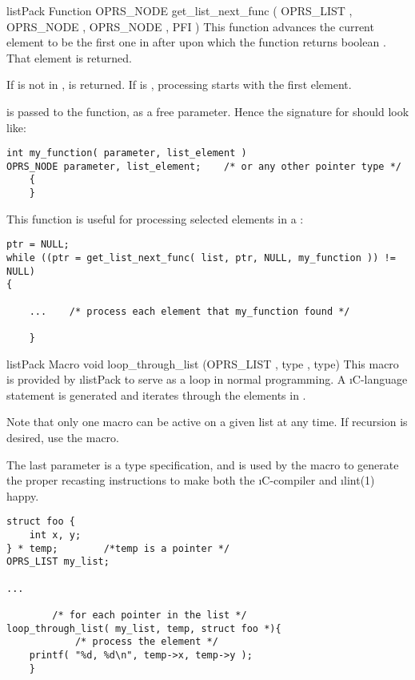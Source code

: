 \begin{typefn}{listPack Function} {OPRS\_NODE} {get\_list\_next\_func} {( OPRS\_LIST
,
OPRS\_NODE , OPRS\_NODE , PFI )} This function advances the
current  element to be the first one in
 after  upon which the
function
 returns boolean . That element is returned.

If  is not in ,  is returned.
If  is , processing starts with the first element.

 is passed to the function,  as a free
parameter. Hence the signature for  should look like:
\begin{verbatim}
int my_function( parameter, list_element )
OPRS_NODE parameter, list_element;    /* or any other pointer type */
    {
    }
\end{verbatim}

This function is useful for processing selected elements in a :
\begin{verbatim}
ptr = NULL;
while ((ptr = get_list_next_func( list, ptr, NULL, my_function )) != NULL)
{

    ...    /* process each element that my_function found */

    }
\end{verbatim}
\end{typefn}

\begin{typefn}{listPack Macro} {void} {loop\_through\_list} {(OPRS\_LIST ,
type
, type)}
This macro is provided by \i{listPack} to serve as a
 loop in normal programming. A \i{C}-language 
statement is
generated and iterates  through the elements in
.

Note that only one  macro can be active on a
given list at any time. If recursion is desired, use the
 macro.

The last parameter is a type specification, and is used by the macro to
generate the proper recasting instructions to make both the \i{C}-compiler
and \i{lint(1)} happy.
\begin{verbatim}
struct foo {
    int x, y;
} * temp;        /*temp is a pointer */
OPRS_LIST my_list;

...

        /* for each pointer in the list */
loop_through_list( my_list, temp, struct foo *){
            /* process the element */
    printf( "%d, %d\n", temp->x, temp->y );
    }
\end{verbatim}
\end{typefn}

